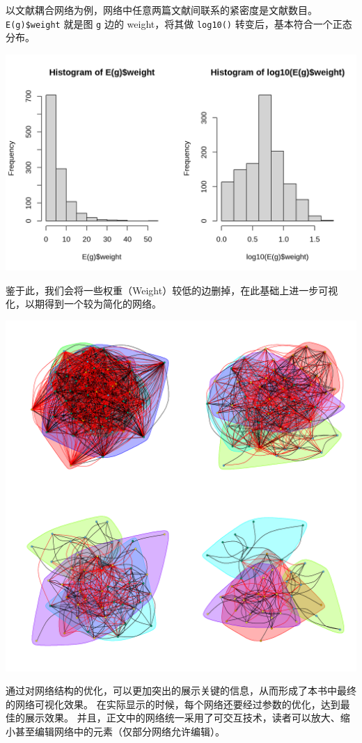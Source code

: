 \documentclass[]{ctexbook}
\begin{document}
以文献耦合网络为例，网络中任意两篇文献间联系的紧密度是文献数目。\texttt{E(g)\$weight} 就是图 \texttt{g} 边的 weight，将其做 \texttt{log10()} 转变后，基本符合一个正态分布。

\includegraphics[width=1\linewidth]{plots/unnamed-chunk-14-1}

鉴于此，我们会将一些权重（Weight）较低的边删掉，在此基础上进一步可视化，以期得到一个较为简化的网络。

\includegraphics[width=1\linewidth]{plots/unnamed-chunk-16-1}

通过对网络结构的优化，可以更加突出的展示关键的信息，从而形成了本书中最终的网络可视化效果。
在实际显示的时候，每个网络还要经过参数的优化，达到最佳的展示效果。
并且，正文中的网络统一采用了可交互技术，读者可以放大、缩小甚至编辑网络中的元素（仅部分网络允许编辑）。
\end{document}

